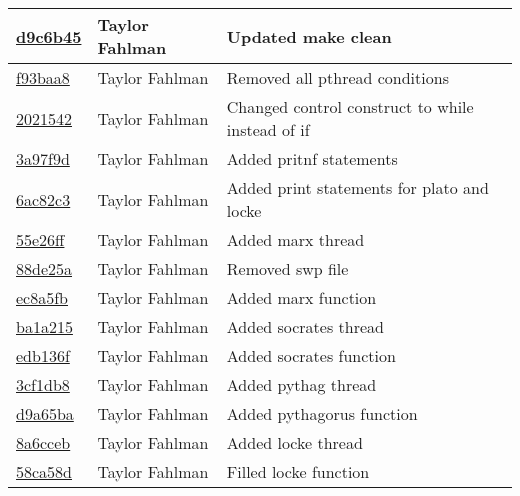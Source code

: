 \begin{tabular}{l l l}
\href{git@github.com:fahlmant/cs444/commit/d9c6b45e2f1eee4649ad42b115e750bd68d2622a}{d9c6b45} & Taylor Fahlman & Updated make clean\\\hline
\href{git@github.com:fahlmant/cs444/commit/f93baa8e24785744b1f3ae51ec64e45e62e6ea6e}{f93baa8} & Taylor Fahlman & Removed all pthread conditions\\\hline
\href{git@github.com:fahlmant/cs444/commit/2021542aebdf6ed1edee48fec117909c7b9926da}{2021542} & Taylor Fahlman & Changed control construct to while instead of if\\\hline
\href{git@github.com:fahlmant/cs444/commit/3a97f9ddf3e62cf13f868b6554fa48b76e200e64}{3a97f9d} & Taylor Fahlman & Added pritnf statements\\\hline
\href{git@github.com:fahlmant/cs444/commit/6ac82c37f00e5ac3d70cc9fce0cdd69a4b09a1c0}{6ac82c3} & Taylor Fahlman & Added print statements for plato and locke\\\hline
\href{git@github.com:fahlmant/cs444/commit/55e26ff34cc7fc3159c10da1add5024754667dbd}{55e26ff} & Taylor Fahlman & Added marx thread\\\hline
\href{git@github.com:fahlmant/cs444/commit/88de25a62a2e699650bc207419b2b384abc5a748}{88de25a} & Taylor Fahlman & Removed swp file\\\hline
\href{git@github.com:fahlmant/cs444/commit/ec8a5fbea281d6bffd2f3df386889152fadb13bc}{ec8a5fb} & Taylor Fahlman & Added marx function\\\hline
\href{git@github.com:fahlmant/cs444/commit/ba1a2150d205c820597bf84f89c025edfb785238}{ba1a215} & Taylor Fahlman & Added socrates thread\\\hline
\href{git@github.com:fahlmant/cs444/commit/edb136fac1c4ed5c5317f7a7a967bad090b32c86}{edb136f} & Taylor Fahlman & Added socrates function\\\hline
\href{git@github.com:fahlmant/cs444/commit/3cf1db8bc4cada1b6be913bc35423bd7d5f15855}{3cf1db8} & Taylor Fahlman & Added pythag thread\\\hline
\href{git@github.com:fahlmant/cs444/commit/d9a65baf438b66b6e0a9fd4cbfdf14bbb4244d5c}{d9a65ba} & Taylor Fahlman & Added pythagorus function\\\hline
\href{git@github.com:fahlmant/cs444/commit/8a6cceb7c92a712f5428de6f30d8c77f80e8dc16}{8a6cceb} & Taylor Fahlman & Added locke thread\\\hline
\href{git@github.com:fahlmant/cs444/commit/58ca58d458e413a75a8c02487bb65cf6acef3d59}{58ca58d} & Taylor Fahlman & Filled locke function\\\hline

\end{tabular}
